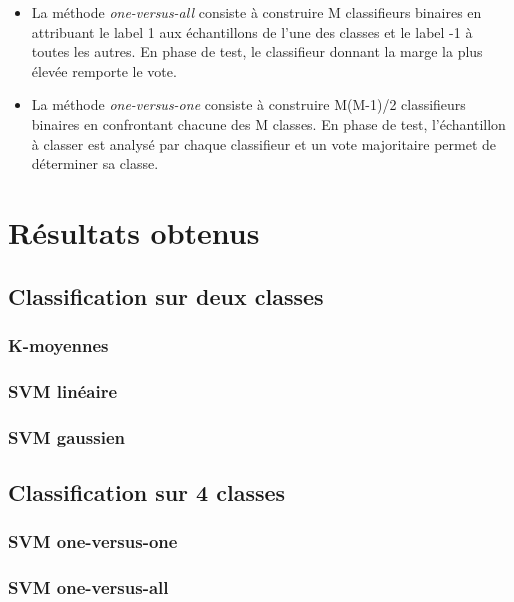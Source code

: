 	\begin{itemize}
	\item La méthode \emph{one-versus-all} consiste à construire M classifieurs binaires en attribuant le label 1 aux échantillons de l'une des classes et le label -1 à toutes les autres. En phase de test, le classifieur donnant la marge la plus élevée remporte le vote.
	\item La méthode \emph{one-versus-one} consiste à construire M(M-1)/2 classifieurs binaires en confrontant chacune des M classes. En phase de test, l'échantillon à classer est analysé par chaque classifieur et un vote majoritaire permet de déterminer sa classe.\\
	\end{itemize}


\section{Résultats obtenus}

	\subsection{Classification sur deux classes}
		\subsubsection{K-moyennes}
		\subsubsection{SVM linéaire}
		\subsubsection{SVM gaussien}

	\subsection{Classification sur 4 classes}
		\subsubsection{SVM one-versus-one}
		\subsubsection{SVM one-versus-all}